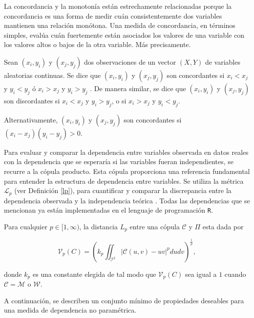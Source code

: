 La concordancia y la monotonía están estrechamente relacionadas porque la concordancia es una forma de medir cuán consistentemente dos variables mantienen una relación monótona. Una medida de concordancia, en términos simples, evalúa cuán fuertemente están asociados los valores de una variable con los valores altos o bajos de la otra variable. Más precisamente. 

\begin{defn}[Concordancia]
    Sean $(x_i, y_i)$ y $(x_j, y_j)$ dos observaciones de un vector $(X, Y)$ de variables aleatorias continuas. Se dice que $(x_i, y_i)$ y $(x_j, y_j)$ son concordantes si $x_i < x_j$ y $y_i < y_j$ ó $x_i > x_j$ y $y_i > y_j$ . De manera similar, se dice que $(x_i, y_i)$ y $(x_j, y_j)$ son discordantes si $x_i < x_j$ y $y_i > y_j$, o si $x_i > x_j$ y $y_i < y_j$. 
    
    Alternativamente, $(x_i, y_i)$ y $(x_j, y_j)$ son concordantes si $(x_i - x_j)(y_i - y_j) > 0$.
\end{defn}

Para evaluar y comparar la dependencia entre variables observada en datos reales con la dependencia que se esperaría si las variables fueran independientes, se recurre a la cópula producto. Esta cópula proporciona una referencia fundamental para entender la estructura de dependencia entre variables. Se utiliza la métrica $\mathcal{L}_p$ (ver Definición \ref{lp}), para cuantificar y comparar la discrepancia entre la dependencia observada y la independencia teórica \cite{TesisEmanuel}. Todas las dependencias que se mencionan ya están implementadas en el lenguaje de programación \texttt{R}.

\begin{defn}\label{lp}
    Para cualquier $p \in[1, \infty)$, la distancia $L_p$ entre una cópula $\mathcal{C}$ y $\Pi$ esta dada por

    \begin{equation}\label{eqLP}
        \mathcal{V}_p(C)=\left(k_p \iint_{\mathcal{I}^2}|\mathcal{C}(u, v)-u v|^p d u d v\right)^{\frac{1}{p}},
    \end{equation}

    donde $k_p$ es una constante elegida de tal modo que $\mathcal{V}_p(C)$ sea igual a $1$ cuando $\mathcal{C}=\mathcal{M}$ o $\mathcal{W}$.
\end{defn}


A continuación, se describen un conjunto mínimo de propiedades deseables para una medida de dependencia no paramétrica. 

